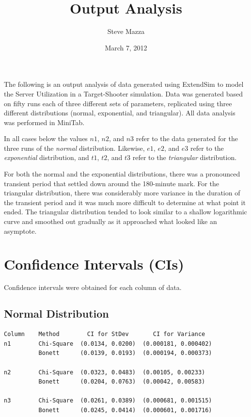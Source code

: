 \documentclass[letterpaper,10pt]{article}
\title{Output Analysis}
\author{Steve Mazza}
\date{March 7, 2012}
\begin{document}
\maketitle
\tableofcontents
\listoffigures
\pagebreak

The following is an output analysis of data generated using ExtendSim to model the Server Utilization in a Target-Shooter simulation.  Data was generated based on fifty runs each of three different sets of parameters, replicated using three different distributions (normal, exponential, and triangular).  All data analysis was performed in MiniTab.

In all cases below the values $n1$, $n2$, and $n3$ refer to the data generated for the three runs of the \emph{normal} distribution.  Likewise, $e1$, $e2$, and $e3$ refer to the \emph{exponential} distribution, and $t1$, $t2$, and $t3$ refer to the \emph{triangular} distribution.

For both the normal and the exponential distributions, there was a pronounced transient period that settled down around the 180-minute mark.  For the triangular distribution, there was considerably more variance in the duration of the transient period and it was much more difficult to determine at what point it ended.  The triangular distribution tended to look similar to a shallow logarithmic curve and smoothed out gradually as it approached what looked like an asymptote.

\section{Confidence Intervals (CIs)}
Confidence intervals were obtained for each column of data.
\subsection{Normal Distribution}
\begin{samepage}
\begin{verbatim}
Column    Method        CI for StDev       CI for Variance
n1        Chi-Square  (0.0134, 0.0200)  (0.000181, 0.000402)
          Bonett      (0.0139, 0.0193)  (0.000194, 0.000373)
          
n2        Chi-Square  (0.0323, 0.0483)  (0.00105, 0.00233)
          Bonett      (0.0204, 0.0763)  (0.00042, 0.00583)
          
n3        Chi-Square  (0.0261, 0.0389)  (0.000681, 0.001515)
          Bonett      (0.0245, 0.0414)  (0.000601, 0.001716) 
\end{verbatim}          
\end{samepage}
\end{document}

